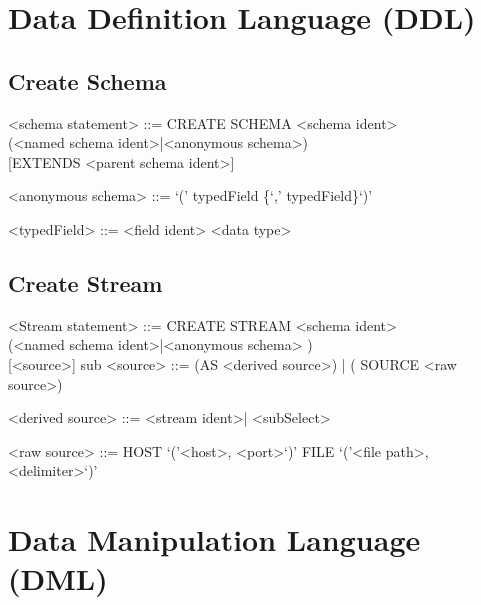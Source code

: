 \section{Data Definition Language (DDL)}
\subsection{Create Schema}

\setlength{\grammarindent}{12em} %

\begin{grammar}

<schema statement> ::= CREATE SCHEMA <schema ident> \\
(<named schema ident>|<anonymous schema>) \\
  { }[EXTENDS <parent schema ident>]

<anonymous schema> ::= `(' typedField \{`,' typedField\}`)'

<typedField> ::= <field ident> <data type>

\end{grammar}
	
	




\subsection{Create Stream}
	
					
\begin{grammar}
<Stream statement> ::= CREATE STREAM <schema ident> \\		(<named schema ident>|<anonymous schema> ) \\
{ }[<source>]
sub
<source> ::= (AS <derived source>) | ( SOURCE <raw source>)

<derived source> ::=  <stream ident>| <subSelect>

<raw source> ::= 
				HOST `('<host>, <port>`)'
					\alt FILE `('<file path>, <delimiter>`)'
\end{grammar}


\section{Data Manipulation Language (DML)}

